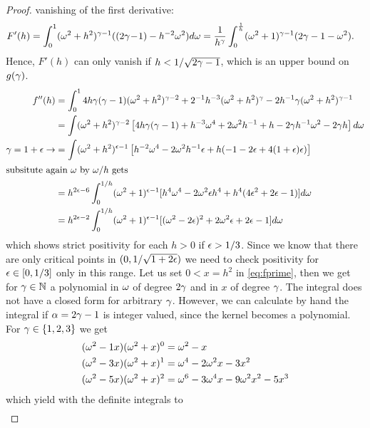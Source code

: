 \documentclass[smallabstract,smallcaptions]{dccpaper}
\begin{document}
\begin{proof}
  vanishing of the first derivative:
  \begin{align}
    F'(h)  &= \int_0^{1} (\omega^2+h^2)^{\gamma-1}( (2\gamma\!-\!1)-h^{-2}\omega^2)d\omega
            =\frac{1}{h^{\gamma}}\int_{0}^{\frac{1}{h}} (\omega^2+1)^{\gamma-1}(2\gamma-1-\omega^2)\notag.
  \end{align}
  Hence, $F'(h)$ can only vanish if $h<1/\sqrt{2\gamma-1}$, which is an upper bound on $g(\gamma)$.
%
\begin{align}
f''(h) &=\int_0^1 4h\gamma(\gamma-1)(\omega^2+h^2)^{\gamma-2} + 2^{-1}h^{-3}(\omega^2+h^2)^{\gamma} - 2h^{-1}\gamma(\omega^2+h^2)^{\gamma-1}\\
&= \int (\omega^2+h^2)^{\gamma-2}\left[ 4h\gamma(\gamma-1)+h^{-3}\omega^4 + 2\omega^2 h^{-1} +h -2\gamma h^{-1}\omega^2-2\gamma h\right]d
\omega\notag\\
\gamma=1+\epsilon\rightarrow &= \int (\omega^2+h^2)^{\epsilon-1}\left[h^{-2} \omega^4 -2\omega^2 h^{-1}\epsilon+h(-1-2\epsilon+4(1+\epsilon)\epsilon)\right] \\
\intertext{subsitute again $\omega$ by $\omega/h$ gets}
&=h^{2\epsilon-6}\int_0^{1/h}(\omega^2+1)^{\epsilon-1}[h^4\omega^4-2\omega^2\epsilon h^{4} +h^{4}(4\epsilon^2+2\epsilon-1)]d\omega\\
&=h^{2\epsilon-2}\int_0^{1/h}(\omega^2+1)^{\epsilon-1}[ (\omega^2-2\epsilon)^2 +2\omega^2\epsilon +2\epsilon-1]d\omega
\end{align}
%
which shows strict positivity for each $h>0$ if $\epsilon>1/3$. Since we know that there are only critical points in
$(0,1/\sqrt{1+2\epsilon})$ we need to check positivity for $\epsilon\in[0,1/3]$ only in this range. 
%
\fi %
%
Let us set $0<x=h^2$ in \eqref{eq:fprime}, then we get for $\gamma\in{\ensuremath{\mathbb N}}$ a polynomial in $\omega$ of degree $2\gamma$ and in
$x$ of degree $\gamma$.
%
%
The integral does not have a closed form for arbitrary $\gamma$. However, we can calculate by hand the integral if
$\alpha=2\gamma-1$ is integer valued, since the kernel becomes a polynomial. For $\gamma\in\{1,2,3\}$ we get 
%
\begin{align}
  (\omega^2-1x)(\omega^2+x)^0 &=\omega^2-x\\
  (\omega^2-3x)(\omega^2+x)^1 &=\omega^4 -2\omega^2x -3x^2 \\
  (\omega^2-5x)(\omega^2+x)^2 &=\omega^6 -3\omega^4x -9\omega^2x^2-5x^3
\end{align}
%
which yield with the definite integrals to
%
\begin{align}

\end{align}
\end{proof}
\end{document}
